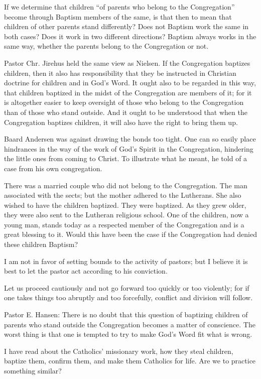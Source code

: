 If we determine that children “of parents who belong to the Congregation” become through Baptism members of the same, is that then to mean that children of other parents stand differently? Does not Baptism work the same in both cases? Does it work in two different directions? Baptism always works in the same way, whether the parents belong to the Congregation or not.

Pastor Chr. Jirehus held the same view as Nielsen. If the Congregation baptizes children, then it also has responsibility that they be instructed in Christian doctrine for children and in God’s Word. It ought also to be regarded in this way, that children baptized in the midst of the Congregation are members of it; for it is altogether easier to keep oversight of those who belong to the Congregation than of those who stand outside. And it ought to be understood that when the Congregation baptizes children, it will also have the right to bring them up.

Baard Andersen was against drawing the bonds too tight. One can so easily place hindrances in the way of the work of God’s Spirit in the Congregation, hindering the little ones from coming to Christ. To illustrate what he meant, he told of a case from his own congregation.

There was a married couple who did not belong to the Congregation. The man associated with the sects; but the mother adhered to the Lutherans. She also wished to have the children baptized. They were baptized. As they grew older, they were also sent to the Lutheran religious school. One of the children, now a young man, stands today as a respected member of the Congregation and is a great blessing to it. Would this have been the case if the Congregation had denied these children Baptism?

I am not in favor of setting bounds to the activity of pastors; but I believe it is best to let the pastor act according to his conviction.

Let us proceed cautiously and not go forward too quickly or too violently; for if one takes things too abruptly and too forcefully, conflict and division will follow.

Pastor E. Hansen: There is no doubt that this question of baptizing children of parents who stand outside the Congregation becomes a matter of conscience. The worst thing is that one is tempted to try to make God’s Word fit what is wrong.

I have read about the Catholics’ missionary work, how they steal children, baptize them, confirm them, and make them Catholics for life. Are we to practice something similar?

